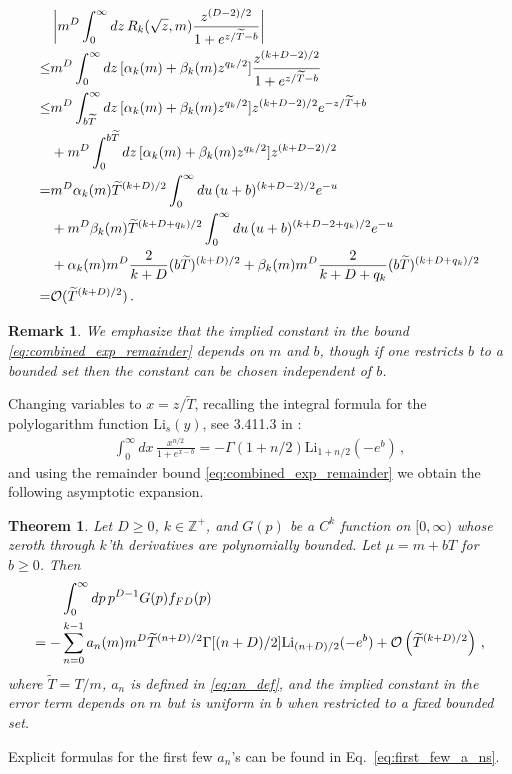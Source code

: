 \documentclass[sn-mathphys,Numbered]{sn-jnl}
\newtheorem{theorem}{Theorem}
\newtheorem{remark}{Remark}
\begin{document}
\begin{align}
 &\left|m^{D}\int_0^\infty dz\, R_k(\sqrt{z},m)\frac{z^{(D-2)/2}}{1+e^{z/\widetilde{T}-b}}\right|\\
 \leq&m^{D}\int_0^\infty dz\, [\alpha_k(m)+\beta_k(m)z^{q_k/2}]\frac{z^{(k+D-2)/2}}{1+e^{z/\widetilde{T}-b}}\notag\\
 \leq &m^{D}\int_{b\widetilde{T}}^\infty dz\, [\alpha_k(m)+\beta_k(m)z^{q_k/2}]z^{(k+D-2)/2}e^{-z/\widetilde{T}+b}\notag\\
 &+m^{D}\int_0^{{b\widetilde{T}}} dz\, [\alpha_k(m)+\beta_k(m)z^{q_k/2}]z^{(k+D-2)/2}\notag\\
 =&m^{D} \alpha_k(m)\widetilde{T}^{(k+D)/2}\int_{0}^\infty du\,(u+b)^{(k+D-2)/2}e^{-u}\notag\\
 &+m^D\beta_k(m)\widetilde{T}^{(k+D+q_k)/2}\int_{0}^\infty du\,(u+b)^{(k+D-2+q_k)/2}e^{-u}\notag\\
 &+\alpha_k(m)m^{D}\frac{2}{k+D}(b\widetilde{T})^{(k+D)/2}+\beta_k(m)m^{D}\frac{2}{k+D+q_k}(b\widetilde{T})^{(k+D+q_k)/2}\notag\\
 =&\mathcal{O}(\widetilde{T}^{(k+D)/2})\,.\label{eq:combined_exp_remainder}
\end{align}
\begin{remark}\label{remark:combined_remainder_uniform_in_b}
We emphasize that the implied constant in the bound \eqref{eq:combined_exp_remainder} depends on $m$ and $b$, though if one restricts $b$ to a bounded set then the constant can be chosen independent of $b$. 
\end{remark}

Changing variables to $x=z/\widetilde{T}$, recalling the integral formula for the polylogarithm function $\mathrm{Li}_s(y)$, see 3.411.3 in  \cite{Gradshteyn:1943cpj}:
\begin{align}\label{eq:h_decomp_eval}
   \int_0^\infty dx \, \frac{x^{n/2}}{1+e^{x-b}}    =-\Gamma(1+n/2)\mathrm{Li}_{1+n/2}(-e^b)\,,
\end{align}
and using the  remainder bound \eqref{eq:combined_exp_remainder} we obtain the following asymptotic expansion.
\begin{theorem}\label{thm:asymp_FD_int_Delta_mu_small}
Let $D\geq 0$, $k\in\mathbb{Z}^+$, and $G(p)$ be a  $C^k$ function on $[0,\infty)$ whose zeroth through $k$'th derivatives are polynomially bounded.  Let $\mu=m+bT$ for $b\geq 0$. Then
\begin{align}\label{eq:asymp_FD_int}
&\int_0^\infty dp\, p^{D-1} G(p) f_{FD}(p)\notag\\
   =-&\sum_{n=0}^{k-1} a_n(m)m^{D}\widetilde{T}^{(n+D)/2}\Gamma[(n+D)/2]\mathrm{Li}_{(n+D)/2}(-e^b)+\mathcal{O}\left(\widetilde{T}^{(k+D)/2}\right)\,,
\end{align}
where $\widetilde{T}=T/m$, $a_n$ is defined in \eqref{eq:an_def}, and the implied constant in the error term depends on $m$ but is uniform in $b$ when restricted to a fixed bounded set. 
\end{theorem}
Explicit formulas for the first few $a_n$'s can be found in Eq.~\eqref{eq:first_few_a_ns}.
\end{document}
